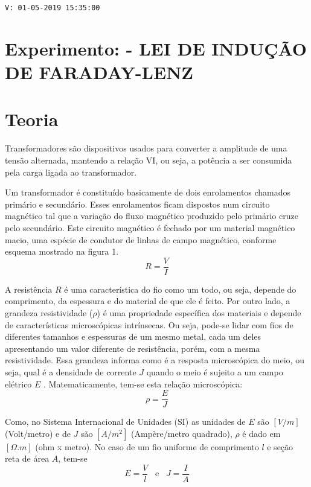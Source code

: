 \noindent \texttt{V: 01-05-2019 15:35:00}

\section*{Experimento: - LEI DE INDUÇÃO DE FARADAY-LENZ}
\section*{Teoria}

Transformadores são dispositivos usados para converter a amplitude de uma tensão alternada, mantendo a relação VI, ou seja, a potência a ser consumida pela carga ligada ao transformador.  

Um transformador é constituído basicamente de dois enrolamentos chamados primário e secundário. Esses enrolamentos ficam dispostos num circuito magnético tal que a variação do fluxo magnético produzido pelo primário cruze pelo secundário. Este circuito magnético é fechado por um material magnético macio, uma espécie de condutor de linhas de campo magnético, conforme esquema mostrado na figura 1.  
\begin{equation}
    R = \frac{V}{I}
    \label{eq:R}
\end{equation}

\noindent A resistência $R$ é uma característica do fio como um todo, ou seja, depende do comprimento, da espessura e do material de que ele é feito. Por outro lado, a grandeza resistividade ($\rho$) é uma propriedade específica dos materiais e depende de características microscópicas intrínsecas. Ou seja, pode-se lidar com fios de diferentes tamanhos e espessuras de um mesmo metal, cada um deles apresentando um valor diferente de resistência, porém, com a mesma resistividade. Essa grandeza informa como é a resposta microscópica do meio, ou seja, qual é a densidade de corrente $J$ quando o meio é sujeito a um campo elétrico $E$ . Matematicamente, tem-se esta relação microscópica:
\begin{equation}
    \rho = \frac{E}{J}
    \label{eq:rho}
\end{equation}

\noindent Como, no Sistema Internacional de Unidades (SI) as unidades de $E$ são $[V/m]$ (Volt/metro) e de $J$ são $[A/m^{2}]$ (Ampère/metro quadrado), $\rho$ é dado em $[\Omega.m]$ (ohm x metro).
No caso de um fio uniforme de comprimento $l$ e seção reta de área $A$, tem-se
\begin{equation}
    E = \frac{V}{l} \;\;\; \text{e} \;\;\; J = \frac{I}{A}
    \label{eq:EeJ}
\end{equation}

